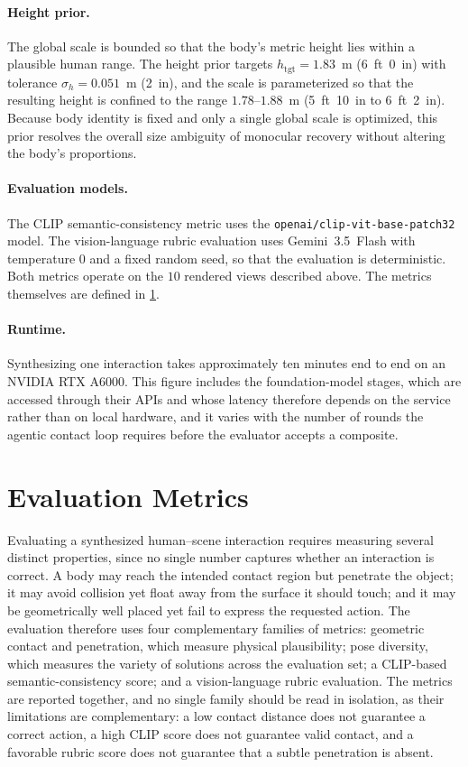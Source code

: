 \paragraph{Height prior.} The global scale is bounded so that the body's metric height lies within a plausible human range. The height prior targets $h_{\mathrm{tgt}} = 1.83$~m (6~ft~0~in) with tolerance $\sigma_h = 0.051$~m (2~in), and the scale is parameterized so that the resulting height is confined to the range $1.78$--$1.88$~m (5~ft~10~in to 6~ft~2~in). Because body identity is fixed and only a single global scale is optimized, this prior resolves the overall size ambiguity of monocular recovery without altering the body's proportions.

\paragraph{Evaluation models.} The CLIP semantic-consistency metric uses the \texttt{openai/clip-vit-base-patch32} model. The vision-language rubric evaluation uses Gemini~3.5~Flash with temperature $0$ and a fixed random seed, so that the evaluation is deterministic. Both metrics operate on the $10$ rendered views described above. The metrics themselves are defined in \cref{sec:exp-metrics}.

\paragraph{Runtime.} Synthesizing one interaction takes approximately ten minutes end to end on an NVIDIA RTX A6000. This figure includes the foundation-model stages, which are accessed through their APIs and whose latency therefore depends on the service rather than on local hardware, and it varies with the number of rounds the agentic contact loop requires before the evaluator accepts a composite.

\section{Evaluation Metrics}
\label{sec:exp-metrics}

Evaluating a synthesized human--scene interaction requires measuring several distinct properties, since no single number captures whether an interaction is correct. A body may reach the intended contact region but penetrate the object; it may avoid collision yet float away from the surface it should touch; and it may be geometrically well placed yet fail to express the requested action. The evaluation therefore uses four complementary families of metrics: geometric contact and penetration, which measure physical plausibility; pose diversity, which measures the variety of solutions across the evaluation set; a CLIP-based semantic-consistency score; and a vision-language rubric evaluation. The metrics are reported together, and no single family should be read in isolation, as their limitations are complementary: a low contact distance does not guarantee a correct action, a high CLIP score does not guarantee valid contact, and a favorable rubric score does not guarantee that a subtle penetration is absent.

